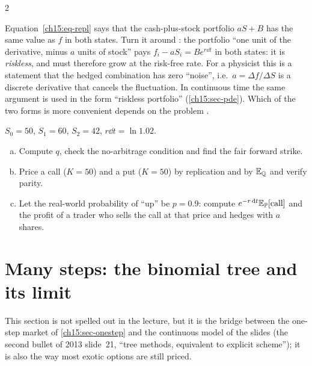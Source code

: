 \begin{paracol}{2}
\begin{intuition}\label{ch15:int-riskless}
Equation~\eqref{ch15:eq-repl} says that the cash-plus-stock portfolio $aS+B$ has the same value as $f$ in both states. Turn it around
: the portfolio ``one unit of the derivative, minus $a$ units of stock'' pays $f_i-aS_i=Be^{r\dd t}$ in both
states: it is \emph{riskless}, and must therefore grow at the risk-free rate. For a physicist this is a statement that the hedged
combination has zero ``noise'', i.e.\ $a=\Delta f/\Delta S$ is a discrete derivative that cancels the fluctuation. In continuous time the same argument is
used in the form ``riskless portfolio'' (\cref{ch15:sec-pde}). Which of the two forms is more convenient depends on the problem .
\end{intuition}

\begin{exercise}\label{ch15:ex-onestep}
$S_0=50$, $S_1=60$, $S_2=42$, $r\dd t=\ln1.02$.
\begin{enumerate}[(a)]
  \item Compute $q$, check the no-arbitrage condition and find the fair forward strike.
  \item Price a call ($K=50$) and a put ($K=50$) by replication and by $\mathbb{E}_{\mathbb{Q}}$ and verify parity.
  \item Let the real-world probability of ``up'' be $p=0.9$: compute $e^{-r\,\mathrm{d} t}\mathbb{E}_{\mathbb{P}}[\text{call}]$ and the profit of a trader who sells the call at that price and hedges with $a$ shares.
\end{enumerate}
\end{exercise}


\section{Many steps: the binomial tree and its limit}\label{ch15:sec-tree}
This section is not spelled out in the lecture, but it is the bridge between the one-step market of
\cref{ch15:sec-onestep} and the continuous model of the slides (the second bullet of 2013 slide~21, ``tree methods, equivalent to
explicit scheme''); it is also the way most exotic options are still priced.


\end{paracol}
